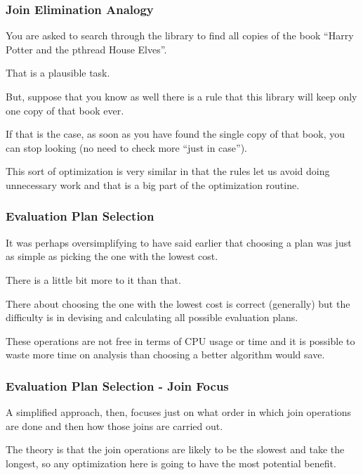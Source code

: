 \begin{frame}
\frametitle{Join Elimination Analogy}
You are asked to search through the library to find all copies of the book ``Harry Potter and the pthread House Elves''. 

That is a plausible task. 

But, suppose that you know as well there is a rule that this library will keep only one copy of that book ever. 

If that is the case, as soon as you have found the single copy of that book, you can stop looking (no need to check more ``just in case''). 

This sort of optimization is very similar in that the rules let us avoid doing unnecessary work and that is a big part of the optimization routine.

\end{frame}


\begin{frame}
\frametitle{Evaluation Plan Selection}

It was perhaps oversimplifying to have said earlier that choosing a plan was just as simple as picking the one with the lowest cost. 

There is a little bit more to it than that.

There about choosing the one with the lowest cost is correct (generally) but the difficulty is in devising and calculating all possible evaluation plans. 

These operations are not free in terms of CPU usage or time and it is possible to waste more time on analysis than choosing a better algorithm would save. 

\end{frame}


\begin{frame}
\frametitle{Evaluation Plan Selection - Join Focus}

A simplified approach, then, focuses just on what order in which join operations are done and then how those joins are carried out. 

The theory is that the join operations are likely to be the slowest and take the longest, so any optimization here is going to have the most potential benefit.


\end{frame}


